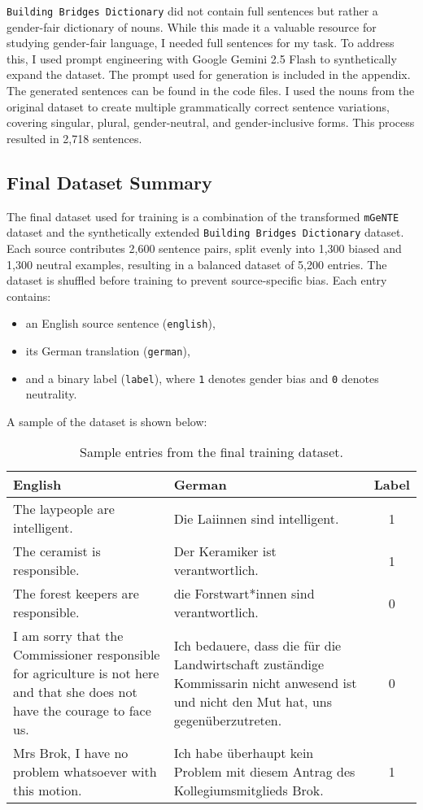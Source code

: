 \texttt{Building Bridges Dictionary} did not contain full sentences but rather a gender-fair dictionary of nouns. While this made it a valuable resource for studying gender-fair language, I needed full sentences for my task. To address this, I used prompt engineering with Google Gemini 2.5 Flash to synthetically expand the dataset. The prompt used for generation is included in the appendix. The generated sentences can be found in the code files. I used the nouns from the original dataset to create multiple grammatically correct sentence variations, covering singular, plural, gender-neutral, and gender-inclusive forms. This process resulted in 2,718 sentences.

\subsection{Final Dataset Summary}
The final dataset used for training is a combination of the transformed \texttt{mGeNTE} dataset and the synthetically extended \texttt{Building Bridges Dictionary} dataset. Each source contributes 2,600 sentence pairs, split evenly into 1,300 biased and 1,300 neutral examples, resulting in a balanced dataset of 5,200 entries. The dataset is shuffled before training to prevent source-specific bias. Each entry contains:
\begin{itemize}
    \item an English source sentence (\texttt{english}),
    \item its German translation (\texttt{german}),
    \item and a binary label (\texttt{label}), where \texttt{1} denotes gender bias and \texttt{0} denotes neutrality.
\end{itemize}

\noindent A sample of the dataset is shown below:

\begin{table}[ht!]
\renewcommand{\arraystretch}{1.2}
\setlength{\tabcolsep}{6pt}
\begin{tabularx}{\textwidth}{>{\raggedright\arraybackslash}X >{\raggedright\arraybackslash}X c}
\toprule
\textbf{English} & \textbf{German} & \textbf{Label} \\
\midrule
The laypeople are intelligent. & Die Laiinnen sind intelligent. & 1 \\
The ceramist is responsible. & Der Keramiker ist verantwortlich. & 1 \\
The forest keepers are responsible. & die Forstwart*innen sind verantwortlich. & 0 \\
I am sorry that the Commissioner responsible for agriculture is not here and that she does not have the courage to face us. & Ich bedauere, dass die für die Landwirtschaft zuständige Kommissarin nicht anwesend ist und nicht den Mut hat, uns gegenüberzutreten. & 0 \\
Mrs Brok, I have no problem whatsoever with this motion. & Ich habe überhaupt kein Problem mit diesem Antrag des Kollegiumsmitglieds Brok. & 1 \\
\bottomrule
\end{tabularx}
\caption{Sample entries from the final training dataset.}
\end{table}

